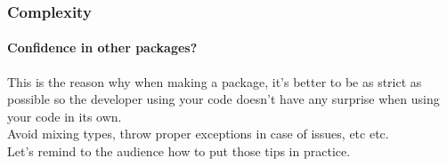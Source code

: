 \begin{frame}
  \frametitle{Complexity}
  \framesubtitle{Confidence in other packages?}

  This is the reason why when making a package, it's better to be as strict
  as possible so the developer using your code doesn't have any surprise when
  using your code in its own.\\
  \pause
  \vfill
  Avoid mixing types, throw proper exceptions in case of issues, etc etc.\\
  \pause
  \vfill
  Let's remind to the audience how to put those tips in practice.

\end{frame}
